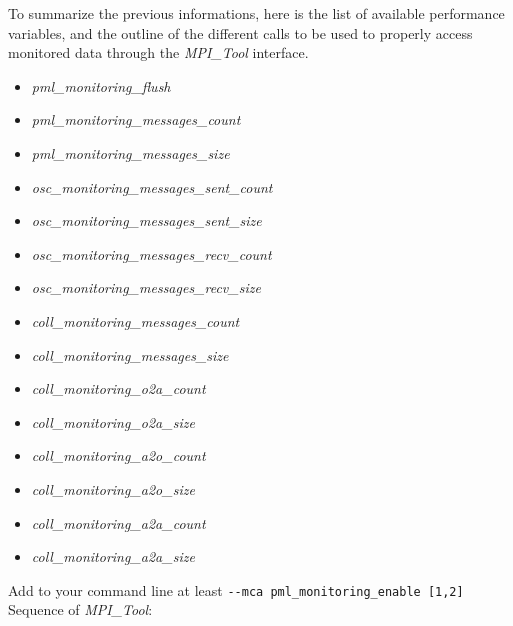 \documentclass[notitlepage]{article}
\newcommand{\mpit}[1]{\textit{MPI\_Tool#1}}
\newcommand{\brkunds}[0]{\allowbreak\_}
\begin{document}
To summarize the previous informations, here is the list of available
performance variables, and the outline of the different calls to be
used to properly access monitored data through the \mpit{} interface.
\begin{itemize}
\item \textit{pml\brkunds{}monitoring\brkunds{}flush}
\item
  \textit{pml\brkunds{}monitoring\brkunds{}messages\brkunds{}count}
\item \textit{pml\brkunds{}monitoring\brkunds{}messages\brkunds{}size}
\item
  \textit{osc\brkunds{}monitoring\brkunds{}messages\brkunds{}sent\brkunds{}count}
\item
  \textit{osc\brkunds{}monitoring\brkunds{}messages\brkunds{}sent\brkunds{}size}
\item
  \textit{osc\brkunds{}monitoring\brkunds{}messages\brkunds{}recv\brkunds{}count}
\item
  \textit{osc\brkunds{}monitoring\brkunds{}messages\brkunds{}recv\brkunds{}size}
\item
  \textit{coll\brkunds{}monitoring\brkunds{}messages\brkunds{}count}
\item
  \textit{coll\brkunds{}monitoring\brkunds{}messages\brkunds{}size}
\item \textit{coll\brkunds{}monitoring\brkunds{}o2a\brkunds{}count}
\item \textit{coll\brkunds{}monitoring\brkunds{}o2a\brkunds{}size}
\item \textit{coll\brkunds{}monitoring\brkunds{}a2o\brkunds{}count}
\item \textit{coll\brkunds{}monitoring\brkunds{}a2o\brkunds{}size}
\item \textit{coll\brkunds{}monitoring\brkunds{}a2a\brkunds{}count}
\item \textit{coll\brkunds{}monitoring\brkunds{}a2a\brkunds{}size}
\end{itemize}
Add to your command line at least \texttt{-{}-mca
  pml\brkunds{}monitoring\brkunds{}enable [1,2]} \\ Sequence of
\mpit{}:
\end{document}
